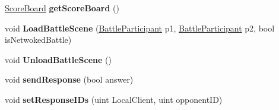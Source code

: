 \begin{DoxyCompactItemize}
\item 
\hypertarget{class_game_manager_a72c1e88ee038dc8afa6acf968742f369}{\hyperlink{class_score_board}{Score\-Board} {\bfseries get\-Score\-Board} ()}\label{class_game_manager_a72c1e88ee038dc8afa6acf968742f369}

\item 
\hypertarget{class_game_manager_a9d3b6a3fb49a9402e1afde9224a12e21}{void {\bfseries Load\-Battle\-Scene} (\hyperlink{class_battle_participant}{Battle\-Participant} p1, \hyperlink{class_battle_participant}{Battle\-Participant} p2, bool is\-Netwoked\-Battle)}\label{class_game_manager_a9d3b6a3fb49a9402e1afde9224a12e21}

\item 
\hypertarget{class_game_manager_a4b49768a7f34b0f3795741f997eca643}{void {\bfseries Unload\-Battle\-Scene} ()}\label{class_game_manager_a4b49768a7f34b0f3795741f997eca643}

\item 
\hypertarget{class_game_manager_a716b6f017d2c90b2e53163a64e0838b7}{void {\bfseries send\-Response} (bool answer)}\label{class_game_manager_a716b6f017d2c90b2e53163a64e0838b7}

\item 
\hypertarget{class_game_manager_ae47f87854a1314f74035195257b84233}{void {\bfseries set\-Response\-I\-Ds} (uint Local\-Client, uint opponent\-I\-D)}\label{class_game_manager_ae47f87854a1314f74035195257b84233}

\end{DoxyCompactItemize}
